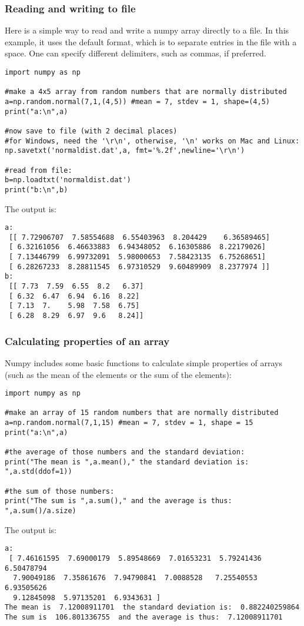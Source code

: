 \subsubsection{Reading and writing to file}
Here is a simple way to read and write a numpy array directly to a file. In this example, it uses the default format, which is to separate entries in the file with a space. One can specify different delimiters, such as commas, if preferred.
\begin{lstlisting}[frame=single] 
import numpy as np

#make a 4x5 array from random numbers that are normally distributed
a=np.random.normal(7,1,(4,5)) #mean = 7, stdev = 1, shape=(4,5)
print("a:\n",a)

#now save to file (with 2 decimal places)
#for Windows, need the '\r\n', otherwise, '\n' works on Mac and Linux:
np.savetxt('normaldist.dat',a, fmt='%.2f',newline='\r\n')

#read from file:
b=np.loadtxt('normaldist.dat')
print("b:\n",b)
\end{lstlisting} 
The output is:
\begin{verbatim}
a:
 [[ 7.72906707  7.58554688  6.55403963  8.204429    6.36589465]
 [ 6.32161056  6.46633883  6.94348052  6.16305886  8.22179026]
 [ 7.13446799  6.99732091  5.98000653  7.58423135  6.75268651]
 [ 6.28267233  8.28811545  6.97310529  9.60489909  8.2377974 ]]
b:
 [[ 7.73  7.59  6.55  8.2   6.37]
 [ 6.32  6.47  6.94  6.16  8.22]
 [ 7.13  7.    5.98  7.58  6.75]
 [ 6.28  8.29  6.97  9.6   8.24]]
\end{verbatim}

\subsubsection{Calculating properties of an array}
Numpy includes some basic functions to calculate simple properties of arrays (such as the mean of the elements or the sum of the elements):
\begin{lstlisting}[frame=single] 
import numpy as np

#make an array of 15 random numbers that are normally distributed
a=np.random.normal(7,1,15) #mean = 7, stdev = 1, shape = 15
print("a:\n",a)

#the average of those numbers and the standard deviation:
print("The mean is ",a.mean()," the standard deviation is: ",a.std(ddof=1))

#the sum of those numbers:
print("The sum is ",a.sum()," and the average is thus: ",a.sum()/a.size)
\end{lstlisting} 
The output is:
\begin{verbatim}
a:
 [ 7.46161595  7.69000179  5.89548669  7.01653231  5.79241436  6.50478794
  7.90049186  7.35861676  7.94790841  7.0088528   7.25540553  6.93505626
  9.12845098  5.97135201  6.9343631 ]
The mean is  7.12008911701  the standard deviation is:  0.882240259864
The sum is  106.801336755  and the average is thus:  7.12008911701
\end{verbatim}

